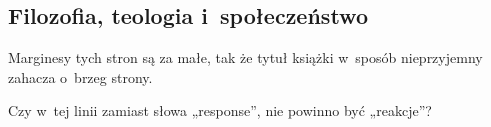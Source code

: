 \documentclass[a4paper,11pt]{article}
\begin{document}
\subsection{Filozofia, teologia i~społeczeństwo}

\vspace{\spaceTwo}




\vspace{0em}



\vspace{0em}


\noindent
{} Marginesy tych stron są za małe, tak że tytuł książki
w~sposób nieprzyjemny zahacza o~brzeg strony.

\vspace{\spaceFour}





\noindent
{} Czy w~tej linii zamiast słowa „response”, nie powinno
być „reakcje”?

\vspace{\spaceFour}















\newpage

\end{document}
